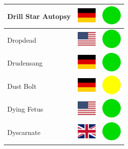 \documentclass[12pt, a4paper, twoside]{report}
\begin{document}
\begin{center}
\begin{longtable}{|p{5cm}|p{2cm}|p{2cm}|}
 Drill Star Autopsy                                         & \includegraphics[width=1cm]{../img/flags/de} &   \includegraphics[width=1cm]{../likes/y} \\ \hline
 Dropdead                                                   & \includegraphics[width=1cm]{../img/flags/us} &   \includegraphics[width=1cm]{../likes/y} \\ \hline
 Drudensang                                                 & \includegraphics[width=1cm]{../img/flags/de} &   \includegraphics[width=1cm]{../likes/y} \\ \hline
 Dust Bolt                                                  & \includegraphics[width=1cm]{../img/flags/de} &   \includegraphics[width=1cm]{../likes/m} \\ \hline
 Dying Fetus                                                & \includegraphics[width=1cm]{../img/flags/us} &   \includegraphics[width=1cm]{../likes/y} \\ \hline
 Dyscarnate                                                 & \includegraphics[width=1cm]{../img/flags/gb} &   \includegraphics[width=1cm]{../likes/y} \\ \hline

\end{longtable}
\end{center}
\end{document}
